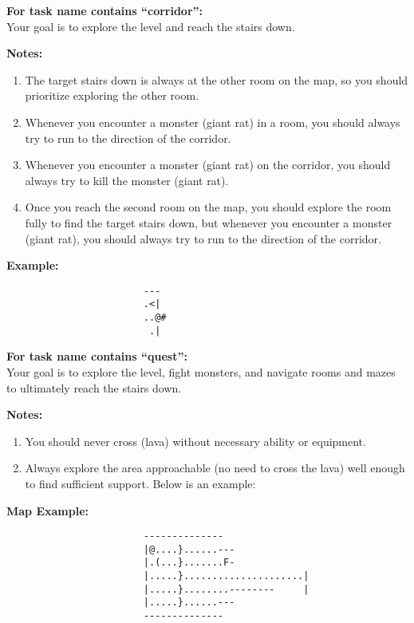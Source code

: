 \begin{MyGreenBox}[frametitle={\textbf{Iteration 1 MiniHack Prompt}}]
\textbf{For task name contains “corridor”:}\\
Your goal is to explore the level and reach the stairs down.

\textbf{Notes:}
\begin{enumerate}
  \item The target stairs down is always at the other room on the map, so you should prioritize exploring the other room.
  \item Whenever you encounter a monster (giant rat) in a room, you should always try to run to the direction of the corridor.
  \item Whenever you encounter a monster (giant rat) on the corridor, you should always try to kill the monster (giant rat).
  \item Once you reach the second room on the map, you should explore the room fully to find the target stairs down, but whenever you encounter a monster (giant rat), you should always try to run to the direction of the corridor.
\end{enumerate}

\textbf{Example:}
\begin{verbatim}
                        ---
                        .<|
                        ..@#
                         .|
\end{verbatim}

\textbf{For task name contains “quest”:}\\
Your goal is to explore the level, fight monsters, and navigate rooms and mazes to ultimately reach the stairs down.

\textbf{Notes:}
\begin{enumerate}
  \item You should never cross (lava) without necessary ability or equipment.
  \item Always explore the area approachable (no need to cross the lava) well enough to find sufficient support. Below is an example:
\end{enumerate}

\textbf{Map Example:}
\begin{verbatim}
                        --------------
                        |@....}......---
                        |.(...}.......F-
                        |.....}.....................|
                        |.....}........--------     |
                        |.....}......---
                        --------------
\end{verbatim}


\end{MyGreenBox}

